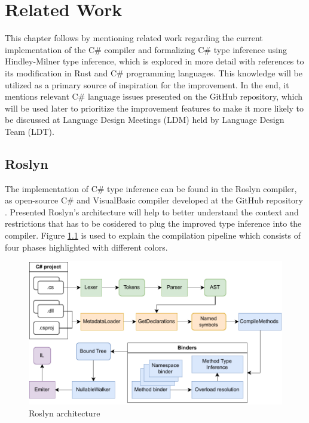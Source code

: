 \chapter{Related Work}

This chapter follows by mentioning related work regarding the current implementation of the C\# compiler and formalizing C\# type inference using Hindley-Milner type inference, which is explored in more detail with references to its modification in Rust and C\# programming languages.
This knowledge will be utilized as a primary source of inspiration for the improvement.
In the end, it mentions relevant C\# language issues presented on the GitHub repository, which will be used later to prioritize the improvement features to make it more likely to be discussed at Language Design Meetings (LDM) held by Language Design Team (LDT). 

\section{Roslyn} \label{sect04:roslyn}

The implementation of C\# type inference can be found in the Roslyn compiler, as open-source C\# and VisualBasic compiler developed at the GitHub repository \cite{online:roslynRepo}. 
Presented Roslyn’s architecture will help to better understand the context and restrictions that has to be cosidered to plug the improved type inference into the compiler.
Figure \ref{img15:roslynPip} is used to explain the compilation pipeline \cite{online:roslynArchitecture} which consists of four phases highlighted with different colors.
\begin{figure}[h]
\centering
\includegraphics[width=140mm]{./img/Roslyn.pdf}
\caption{Roslyn architecture}
\label{img15:roslynPip}
\end{figure}

